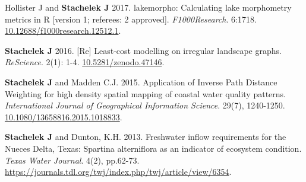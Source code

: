 \documentclass[11pt]{article}
\makeatletter
\newlength{\bibhang}
\newlength{\bibsep}
 {\@listi \global\bibsep\itemsep \global\advance\bibsep by\parsep}
\newenvironment{bibenum*}
  {\renewcommand\labelenumi{[\theenumi]}%
   \etaremune[
     topsep=0pt,
     itemsep=\bibsep,
     parsep=0pt,partopsep=0pt,
     itemindent=-\bibhang,
     leftmargin={\bibhang+\widthof{[999]}}]}
  {\endetaremune}
\renewcommand{\section}[1]{\pagebreak[3]%
    \vspace{1.3\baselineskip}%
    \phantomsection\addcontentsline{toc}{section}{#1}%
    \noindent\llap{\scshape\smash{\parbox[t]{\marginparwidth}{\hyphenpenalty=10000\raggedright #1}}}%
    \vspace{-\baselineskip}\par}
\makeatother
\begin{document}
\begin{bibenum*}
\item Hollister J and \textbf{Stachelek J} 2017. lakemorpho: Calculating lake morphometry metrics in R [version 1; referees: 2 approved]. \emph{F1000Research}. 6:1718. \href{https://doi.org/10.12688/f1000research.12512.1}{10.12688/f1000research.12512.1}.

\item \textbf{Stachelek J} 2016. [Re] Least-cost modelling on irregular landscape graphs. \emph{ReScience}. 2(1): 1-4. \href{https://github.com/ReScience-Archives/Stachelek-2016/raw/master/article/article.pdf}{10.5281/zenodo.47146}.

\item \textbf{Stachelek J} and Madden C.J. 2015. Application of Inverse Path Distance Weighting for high density spatial mapping of coastal water quality patterns. \emph{International Journal of Geographical Information Science}. 29(7), 1240-1250. \href{https://doi.org/10.1080/13658816.2015.1018833}{10.1080/13658816.2015.1018833}.

\item \textbf{Stachelek J} and Dunton, K.H. 2013. Freshwater inflow requirements for the Nueces Delta, Texas: Spartina alterniflora as an indicator of ecosystem condition. \emph{Texas Water Journal}. 4(2), pp.62-73. \href{https://journals.tdl.org/twj/index.php/twj/article/view/6354}{https://journals.tdl.org/twj/index.php/twj/article/view/6354}.


\end{bibenum*}

\vspace{0.1in}

% 
% 
% 
%    
%    
\end{document}
